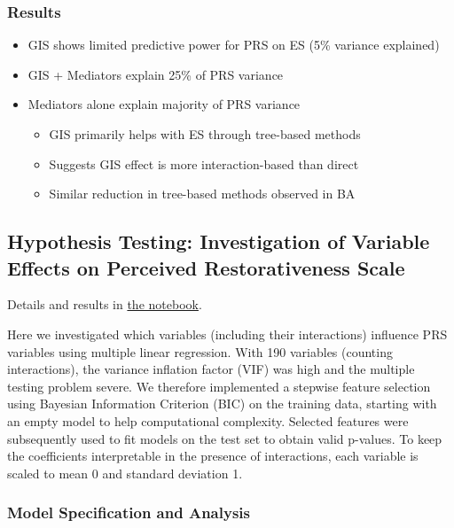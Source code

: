 \documentclass[
  letterpaper,
  DIV=11,
  numbers=noendperiod]{scrartcl}
\providecommand{\tightlist}{%
  \setlength{\itemsep}{0pt}\setlength{\parskip}{0pt}}
\begin{document}
\subsubsection{Results}\label{results}

\begin{itemize}
\tightlist
\item
  GIS shows limited predictive power for PRS on ES (5\% variance
  explained)
\item
  GIS + Mediators explain 25\% of PRS variance
\item
  Mediators alone explain majority of PRS variance

  \begin{itemize}
  \tightlist
  \item
    GIS primarily helps with ES through tree-based methods
  \item
    Suggests GIS effect is more interaction-based than direct
  \item
    Similar reduction in tree-based methods observed in BA
  \end{itemize}
\end{itemize}

\subsection{Hypothesis Testing: Investigation of Variable Effects on
Perceived Restorativeness
Scale}\label{hypothesis-testing-investigation-of-variable-effects-on-perceived-restorativeness-scale}

Details and results in \href{notebooks/hypothethis-tests.qmd}{the
notebook}.

Here we investigated which variables (including their interactions)
influence PRS variables using multiple linear regression. With 190
variables (counting interactions), the variance inflation factor (VIF)
was high and the multiple testing problem severe. We therefore
implemented a stepwise feature selection using Bayesian Information
Criterion (BIC) on the training data, starting with an empty model to
help computational complexity. Selected features were subsequently used
to fit models on the test set to obtain valid p-values. To keep the
coefficients interpretable in the presence of interactions, each
variable is scaled to mean 0 and standard deviation 1.

\subsubsection{Model Specification and
Analysis}\label{model-specification-and-analysis}
\end{document}
